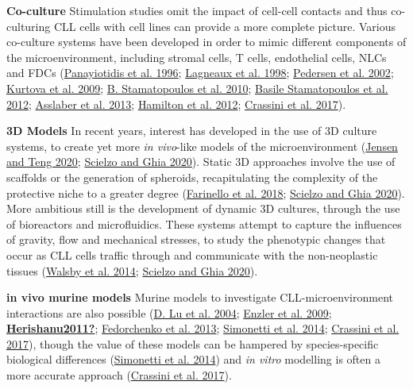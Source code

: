 \documentclass[11pt, a4paper, twosided]{book}
\begin{document}
\textbf{Co-culture}
Stimulation studies omit the impact of cell-cell contacts and thus co-culturing CLL cells with cell lines can provide a more complete picture. Various co-culture systems have been developed in order to mimic different components of the microenvironment, including stromal cells, T cells, endothelial cells, NLCs and FDCs (\protect\hyperlink{ref-Panayiotidis1996}{Panayiotidis et al. 1996}; \protect\hyperlink{ref-Lagneaux1998}{Lagneaux et al. 1998}; \protect\hyperlink{ref-Pedersen2002}{Pedersen et al. 2002}; \protect\hyperlink{ref-Kurtova2009}{Kurtova et al. 2009}; \protect\hyperlink{ref-Stamatopoulos2010}{B. Stamatopoulos et al. 2010}; \protect\hyperlink{ref-Stamatopoulos2012}{Basile Stamatopoulos et al. 2012}; \protect\hyperlink{ref-Asslaber2013}{Asslaber et al. 2013}; \protect\hyperlink{ref-Hamilton2012}{Hamilton et al. 2012}; \protect\hyperlink{ref-Crassini2017}{Crassini et al. 2017}).

\textbf{3D Models}
In recent years, interest has developed in the use of 3D culture systems, to create yet more \emph{in vivo}-like models of the microenvironment (\protect\hyperlink{ref-Jensen2020}{Jensen and Teng 2020}; \protect\hyperlink{ref-Scielzo2020}{Scielzo and Ghia 2020}). Static 3D approaches involve the use of scaffolds or the generation of spheroids, recapitulating the complexity of the protective niche to a greater degree (\protect\hyperlink{ref-Farinello2018}{Farinello et al. 2018}; \protect\hyperlink{ref-Scielzo2020}{Scielzo and Ghia 2020}). More ambitious still is the development of dynamic 3D cultures, through the use of bioreactors and microfluidics. These systems attempt to capture the influences of gravity, flow and mechanical stresses, to study the phenotypic changes that occur as CLL cells traffic through and communicate with the non-neoplastic tissues (\protect\hyperlink{ref-Walsby2014}{Walsby et al. 2014}; \protect\hyperlink{ref-Scielzo2020}{Scielzo and Ghia 2020}).

\textbf{in vivo murine models}
Murine models to investigate CLL-microenvironment interactions are also possible (\protect\hyperlink{ref-Lu2004}{D. Lu et al. 2004}; \protect\hyperlink{ref-Enzler2009}{Enzler et al. 2009}; \protect\hyperlink{ref-Herishanu2011}{\textbf{Herishanu2011?}}; \protect\hyperlink{ref-Fedorchenko2013}{Fedorchenko et al. 2013}; \protect\hyperlink{ref-Simonetti2014}{Simonetti et al. 2014}; \protect\hyperlink{ref-Crassini2017}{Crassini et al. 2017}), though the value of these models can be hampered by species-specific biological differences (\protect\hyperlink{ref-Simonetti2014}{Simonetti et al. 2014}) and \emph{in vitro} modelling is often a more accurate approach (\protect\hyperlink{ref-Crassini2017}{Crassini et al. 2017}).
\end{document}

